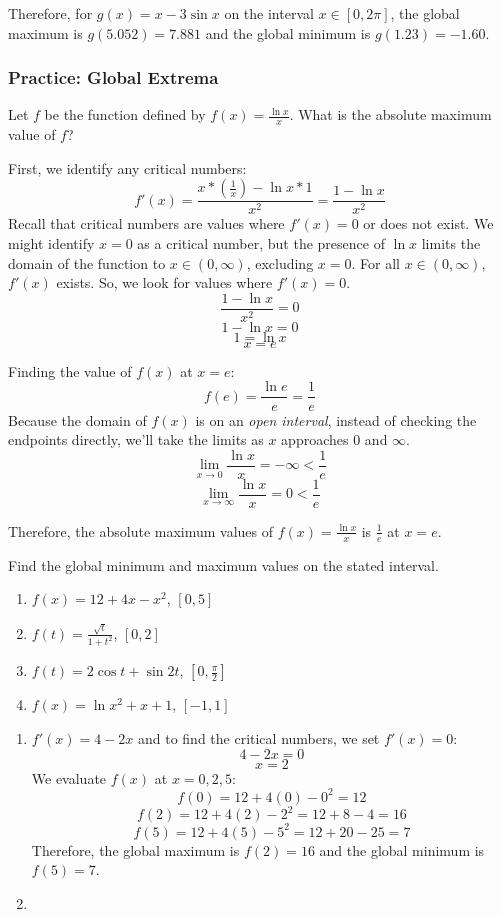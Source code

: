 Therefore, for $g(x) = x-3\sin{x}$ on the interval $x \in [0, 2\pi]$, the global maximum is $g(5.052) = 7.881$ and the global minimum is $g(1.23) = -1.60$. 

\subsubsection{Practice: Global Extrema}
\begin{Exercise}[label=gloext1]
Let $f$ be the function defined by $f(x) = \frac{\ln{x}}{x}$. What is the absolute maximum value of $f$?
\end{Exercise}
\begin{Answer}[ref=gloext1]
First, we identify any critical numbers:
$$f'(x) = \frac{x*(\frac{1}{x})-\ln{x}*1}{x^2} = \frac{1-\ln{x}}{x^2}$$
Recall that critical numbers are values where $f'(x)=0$ or does not exist. We might identify $x=0$ as a critical number, but the presence of $\ln{x}$ limits the domain of the function to $x \in (0, \infty)$, excluding $x=0$. For all $x \in (0, \infty)$, $f'(x)$ exists. So, we look for values where $f'(x) = 0$.
$$\frac{1-\ln{x}}{x^2}=0$$
$$1-\ln{x}=0$$
$$1=\ln{x}$$
$$x=e$$

Finding the value of $f(x)$ at $x=e$: 
$$f(e) = \frac{\ln{e}}{e}=\frac{1}{e}$$
Because the domain of $f(x)$ is on an \textit{open interval}, instead of checking the endpoints directly, we'll take the limits as $x$ approaches $0$ and $\infty$.
$$\lim_{x\to 0}\frac{\ln{x}}{x}=-\infty<\frac{1}{e}$$
$$\lim_{x \to \infty}\frac{\ln{x}}{x}=0<\frac{1}{e}$$

Therefore, the absolute maximum values of $f(x) = \frac{\ln{x}}{x}$ is $\frac{1}{e}$ at $x=e$. 
\end{Answer}

\begin{Exercise}[label=gloext2]
Find the global minimum and maximum values on the stated interval.
\begin{enumerate}
\item $f(x) = 12+4x-x^2$, $[0,5]$
\item $f(t) = \frac{\sqrt{t}}{1+t^2}$, $[0, 2]$
\item $f(t) = 2\cos{t} + \sin{2t}$, $[0, \frac{\pi}{2}]$
\item $f(x) = \ln{x^2+x+1}$, $[-1, 1]$
\end{enumerate}
\end{Exercise}

\begin{Answer}[ref=gloext2]
\begin{enumerate}
\item $f'(x) = 4-2x$ and to find the critical numbers, we set $f'(x)=0$:
$$4-2x=0$$
$$x=2$$
We evaluate $f(x)$ at $x=0, 2, 5$:
$$f(0) = 12+4(0)-0^2=12$$
$$f(2) = 12+4(2)-2^2=12+8-4=16$$
$$f(5) = 12+4(5)-5^2=12+20-25=7$$
Therefore, the global maximum is $f(2) = 16$ and the global minimum is $f(5) = 7$.
\item %
\end{enumerate}
\end{Answer}


